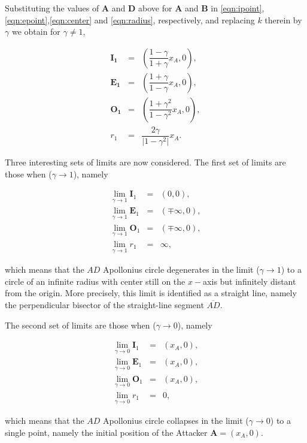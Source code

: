 Substituting the values of $\boldsymbol{A}$ and $\boldsymbol{D}$ above for $\boldsymbol{A}$ and $\boldsymbol{B}$ in \eqref{eqn:ipoint},\eqref{eqn:epoint},\eqref{eqn:center} and \eqref{eqn:radius}, respectively, and replacing $k$ therein by $\gamma$ we obtain for $\gamma\neq1$,

\begin{eqnarray}
\boldsymbol{I_{1}} &=& (\dfrac{1-\gamma}{1+\gamma}x_{A},0),\\
\boldsymbol{E_{1}} &=& (\dfrac{1+\gamma}{1-\gamma}x_{A},0),\\
\boldsymbol{O_{1}} &=& (\dfrac{1+\gamma^{2}}{1-\gamma^{2}}x_{A},0),\\
\label{O1}
r_{1} &=& \dfrac{2\gamma}{\lvert1-\gamma^{2}\rvert}x_{A}.
\label{r1}
\end{eqnarray}

Three interesting sets of limits are now considered. The first set of limits are those when ($\gamma\to1$), namely 

\begin{eqnarray}
\lim_{\gamma\to1} \boldsymbol{I}_1 &=& (0,0),\\
\lim_{\gamma\to1} \boldsymbol{E}_1 &=& (\mp\infty,0),\\
\lim_{\gamma\to1} \boldsymbol{O}_1 &=& (\mp\infty,0),\\
\lim_{\gamma\to1} r_1 &=& \infty,
\end{eqnarray}

which means that the $AD$ Apollonius circle degenerates in the limit ($\gamma\to1$) to a circle of an infinite radius with center still on the $x-$axis but infinitely distant from the origin. More precisely, this limit is identified as a straight line, namely the perpendicular bisector of the straight-line segment $\overline{AD}$.

The second set of limits are those when ($\gamma\to0$), namely 

\begin{eqnarray}
\lim_{\gamma\to0} \boldsymbol{I}_1 &=& (x_A,0),\\
\lim_{\gamma\to0} \boldsymbol{E}_1 &=& (x_A,0),\\
\lim_{\gamma\to0} \boldsymbol{O}_1 &=& (x_A,0),\\
\lim_{\gamma\to0} r_1 &=& 0,
\end{eqnarray}

which means that the $AD$ Apollonius circle collapses in the limit ($\gamma\to0$) to a single point, namely the initial position of the Attacker $\boldsymbol{A}=(x_A,0)$.

